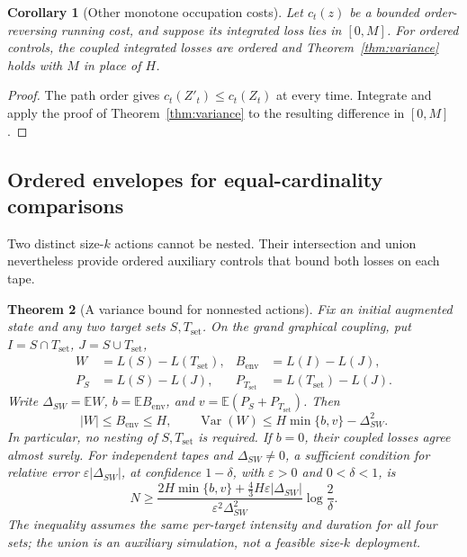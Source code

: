 \documentclass[final,5p,times,twocolumn,sort&compress]{elsarticle}
\theoremstyle{plain}
\newtheorem{theorem}{Theorem}
\newtheorem{corollary}[theorem]{Corollary}
\newcommand{\E}{\mathbb{E}}
\newcommand{\Var}{\operatorname{Var}}
\begin{document}
\begin{corollary}[Other monotone occupation costs]
Let $c_t(z)$ be a bounded order-reversing running cost, and suppose its integrated loss lies in $[0,M]$. For ordered controls, the coupled integrated losses are ordered and Theorem~\ref{thm:variance} holds with $M$ in place of $H$.
\end{corollary}
\begin{proof}
The path order gives $c_t(Z'_t)\le c_t(Z_t)$ at every time. Integrate and apply the proof of Theorem~\ref{thm:variance} to the resulting difference in $[0,M]$.
\end{proof}

\subsection{Ordered envelopes for equal-cardinality comparisons}
Two distinct size-$k$ actions cannot be nested. Their intersection and union nevertheless provide ordered auxiliary controls that bound both losses on each tape.
\begin{theorem}[A variance bound for nonnested actions]
\label{thm:exchange_envelope}
Fix an initial augmented state and any two target sets $S,T_{\mathrm{set}}$. On the grand graphical coupling, put $I=S\cap T_{\mathrm{set}}$, $J=S\cup T_{\mathrm{set}}$,
\begin{align*}
 W&=L(S)-L(T_{\mathrm{set}}), &B_{\mathrm{env}}&=L(I)-L(J),\\
 P_S&=L(S)-L(J), &P_{T_{\mathrm{set}}}&=L(T_{\mathrm{set}})-L(J).
\end{align*}
Write $\Delta_{SW}=\E W$, $b=\E B_{\mathrm{env}}$, and $v=\E(P_S+P_{T_{\mathrm{set}}})$. Then
\begin{equation}
 |W|\le B_{\mathrm{env}}\le H,\qquad
 \Var(W)\le H\min\{b,v\}-\Delta_{SW}^2.
 \label{eq:exchange_var}
\end{equation}
In particular, no nesting of $S,T_{\mathrm{set}}$ is required. If $b=0$, their coupled losses agree almost surely. For independent tapes and $\Delta_{SW}\ne0$, a sufficient condition for relative error $\varepsilon|\Delta_{SW}|$, at confidence $1-\delta$, with $\varepsilon>0$ and $0<\delta<1$, is
\begin{equation}
 N\ge \frac{2H\min\{b,v\}+\frac43H\varepsilon|\Delta_{SW}|}
 {\varepsilon^2\Delta_{SW}^2}\log\frac2\delta.
 \label{eq:exchange_samples}
\end{equation}
The inequality assumes the same per-target intensity and duration for all four sets; the union is an auxiliary simulation, not a feasible size-$k$ deployment.
\end{theorem}
\end{document}
